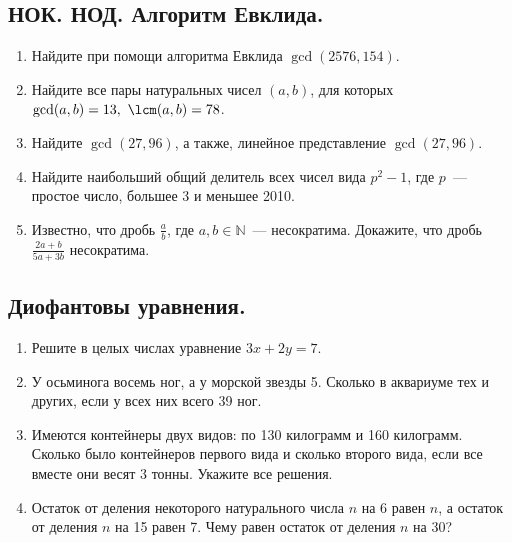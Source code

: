 \documentclass[11pt]{article}
\begin{document}
    \subsection{НОК. НОД. Алгоритм Евклида. }
    \begin{enumerate}[start=25,label={\bfseries \arabic*.}]
        \item Найдите при помощи алгоритма Евклида $\gcd(2576, 154)$.

        \item Найдите все пары натуральных чисел $(a, b)$, для которых $\gcd(a, b) = 13, \ \lcm(a, b) = 78$.

        \item Найдите $\gcd(27, 96)$, а также, линейное представление $\gcd(27, 96)$.

        \item Найдите наибольший общий делитель всех чисел вида $p^2 - 1$, где $p$~--- простое число, большее 3 и меньшее 2010.

        \item Известно, что дробь $\frac{a}{b}$, где $a, b \in \mathbb{N}$~--- несократима. Докажите, что дробь $\frac{2a + b}{5a + 3b}$ несократима.
    \end{enumerate}
    \subsection{Диофантовы уравнения. }
    \begin{enumerate}[start=30,label={\bfseries \arabic*.}]
        \item Решите в целых числах уравнение $3x + 2y = 7$.

        \item У осьминога восемь ног, а у морской звезды 5. Сколько в аквариуме тех и других, если у всех них всего 39 ног.

        \item Имеются контейнеры двух видов: по 130 килограмм и 160 килограмм. Сколько было контейнеров первого вида и сколько второго вида,
              если все вместе они весят 3 тонны. Укажите все решения.

        \item Остаток от деления некоторого натурального числа $n$ на 6 равен $n$, а остаток от деления $n$ на 15 равен 7. Чему равен
              остаток от деления $n$ на 30?
    \end{enumerate}
\end{document}
